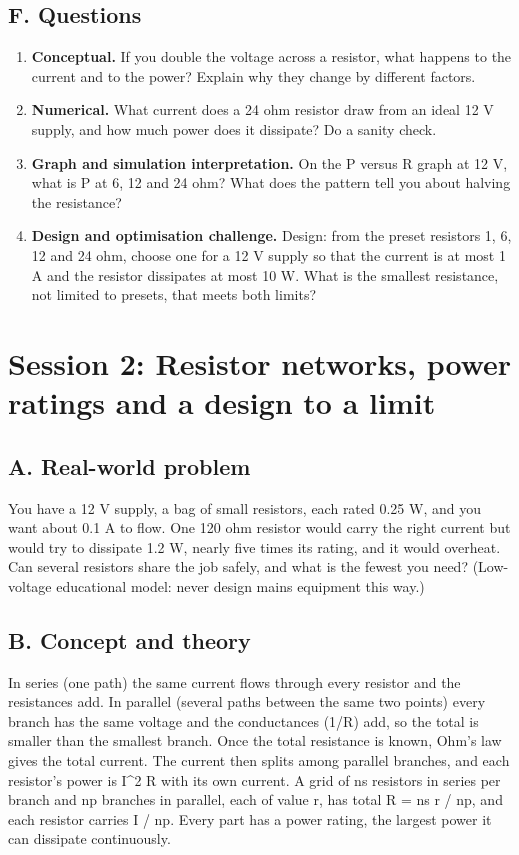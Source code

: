 \documentclass[11pt,a4paper]{article}
\begin{document}
\subsection*{F. Questions}
\begin{enumerate}[nosep]
\item \textbf{Conceptual.} If you double the voltage across a resistor, what happens to the current and to the power? Explain why they change by different factors.
\item \textbf{Numerical.} What current does a 24 ohm resistor draw from an ideal 12 V supply, and how much power does it dissipate? Do a sanity check.
\item \textbf{Graph and simulation interpretation.} On the P versus R graph at 12 V, what is P at 6, 12 and 24 ohm? What does the pattern tell you about halving the resistance?
\item \textbf{Design and optimisation challenge.} Design: from the preset resistors 1, 6, 12 and 24 ohm, choose one for a 12 V supply so that the current is at most 1 A and the resistor dissipates at most 10 W. What is the smallest resistance, not limited to presets, that meets both limits?
\end{enumerate}

\section{Session 2: Resistor networks, power ratings and a design to a limit}

\subsection*{A. Real-world problem}
You have a 12 V supply, a bag of small resistors, each rated 0.25 W, and you want about 0.1 A to flow. One 120 ohm resistor would carry the right current but would try to dissipate 1.2 W, nearly five times its rating, and it would overheat. Can several resistors share the job safely, and what is the fewest you need? (Low-voltage educational model: never design mains equipment this way.)

\subsection*{B. Concept and theory}
In series (one path) the same current flows through every resistor and the resistances add. In parallel (several paths between the same two points) every branch has the same voltage and the conductances (1/R) add, so the total is smaller than the smallest branch. Once the total resistance is known, Ohm's law gives the total current. The current then splits among parallel branches, and each resistor's power is I\textasciicircum{}2 R with its own current. A grid of ns resistors in series per branch and np branches in parallel, each of value r, has total R = ns r / np, and each resistor carries I / np. Every part has a power rating, the largest power it can dissipate continuously.
\end{document}
